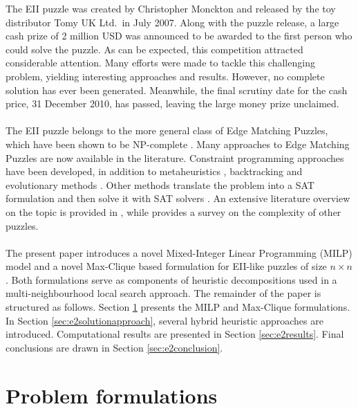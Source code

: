 \documentclass[preprint,12pt]{elsarticle}
\begin{document}
The EII  puzzle %
was created by Christopher Monckton and released by the toy distributor Tomy UK Ltd.~in July 2007.
Along with the puzzle release, a large cash prize of 2 million USD was announced to be awarded to the first person who could solve the puzzle.
As can be expected, this competition attracted considerable attention.
Many efforts were made to tackle this challenging problem, yielding interesting approaches and results. 
However, no complete solution has ever been generated.
Meanwhile, the final scrutiny date for the cash price, 31 December 2010, has passed, leaving the large money prize unclaimed.
\\
\\
The EII puzzle belongs to the more general class of Edge Matching Puzzles, which have been shown to be NP-complete \cite{DD07}.
Many approaches to Edge Matching Puzzles are now available in the literature. 
Constraint programming approaches \cite{BB08,SD08} have been developed, in addition to metaheuristics \cite{CCCHSO10,SD08,WC10}, backtracking \cite{VE08} and evolutionary methods \cite{MGS09}. 
Other methods translate the problem into a SAT formulation and then solve it with SAT solvers \cite{ABFM08,HE08}.
An extensive literature overview on the topic is provided in \cite{WVV12}, while \cite{KPS08} provides a survey on the complexity of other puzzles.
\\
\\
The present paper introduces a novel Mixed-Integer Linear Programming (MILP) model and a novel Max-Clique based formulation for EII-like puzzles of size $n \times n$. %
Both formulations serve as components of heuristic decompositions used in 
a multi-neighbourhood local search approach.
The remainder of the paper is structured as follows.
Section \ref{sec:models} presents the MILP and Max-Clique formulations. 
In Section \ref{sec:e2solutionapproach}, several hybrid heuristic approaches are introduced. Computational results are presented in Section \ref{sec:e2results}. Final conclusions are drawn in Section \ref{sec:e2conclusion}.


\section{Problem formulations}
\label{sec:models}
\end{document}
